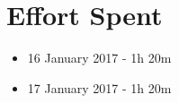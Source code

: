 \section{Effort Spent}

\begin{itemize}
	\item 16 January 2017 - 1h 20m
	\item 17 January 2017 - 1h 20m
\end{itemize}
